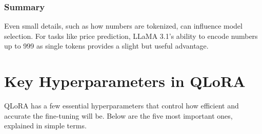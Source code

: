 \subsubsection{Summary}
\begin{tcolorbox}[colback=blue!5!white,colframe=blue!75!black,title=Takeaway]
Even small details, such as how numbers are tokenized, can influence model selection.  
For tasks like price prediction, LLaMA 3.1's ability to encode numbers up to 999 as single tokens provides a slight but useful advantage.
\end{tcolorbox}

\newpage

\newpage
\section{Key Hyperparameters in QLoRA}

QLoRA has a few essential hyperparameters that control how efficient and accurate the fine-tuning will be.  
Below are the five most important ones, explained in simple terms.

